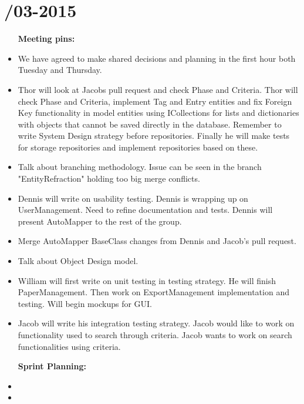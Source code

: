 \section{/03-2015} %
\attend{\at}{\at}{\at}{\at}


\begin{itemize}
	\item [\textbf{Meeting pins:}]
	\item We have agreed to make shared decisions and planning in the first hour both Tuesday and Thursday. 
	\item Thor will look at Jacobs pull request and check Phase and Criteria. Thor will check Phase and Criteria, implement Tag and Entry entities and fix Foreign Key functionality in model entities using ICollections for lists and dictionaries with objects that cannot be saved directly in the database. Remember to write System Design strategy before repositories. Finally he will make tests for storage repositories and implement repositories based on these. 
	\item Talk about branching methodology. Issue can be seen in the branch "EntityRefraction" holding too big merge conflicts.
	\item Dennis will write on usability testing. Dennis is wrapping up on UserManagement. Need to refine documentation and tests. Dennis will present AutoMapper to the rest of the group. 
	\item Merge AutoMapper BaseClass changes from Dennis and Jacob's pull request. 
	\item Talk about Object Design model. 
	\item William will first write on unit testing in testing strategy. He will finish PaperManagement. Then work on ExportManagement implementation and testing. Will begin mockups for GUI. 
	\item Jacob will write his integration testing strategy. Jacob would like to work on functionality used to search through criteria. Jacob wants to work on search functionalities using criteria. 
	\end{itemize}

\begin{itemize}
	\item [\textbf{Sprint Planning:}]
	\item
	\item 
\end{itemize}

